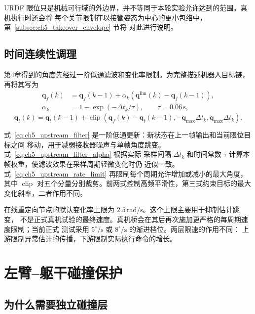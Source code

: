 URDF 限位只是机械可行域的外边界，并不等同于本轮实验允许达到的范围。真机执行时还会将
每个关节限制在以接管姿态为中心的更小包络中，第~\ref{subsec:ch5_takeover_envelope} 节将
对此进行说明。

\subsection{时间连续性调理}
\label{subsec:ch5_temporal_conditioning}

第4章得到的角度先经过一阶低通滤波和变化率限制。为完整描述机器人目标链，再将其写为
\begin{align}
  \boldsymbol q_f(k)
  &=\boldsymbol q_f(k-1)+
  \alpha_k\left(\boldsymbol q^{\mathrm{lim}}(k)-
  \boldsymbol q_f(k-1)\right),
  \label{eq:ch5_upstream_filter}\\
  \alpha_k&=1-\exp(-\Delta t_k/\tau),
  \qquad \tau=0.06\,\mathrm{s},
  \label{eq:ch5_upstream_filter_alpha}
\end{align}
\begin{equation}
  \boldsymbol q_t(k)=\boldsymbol q_t(k-1)+
  \operatorname{clip}\!\left(
  \boldsymbol q_f(k)-\boldsymbol q_t(k-1),
  -\dot{\boldsymbol q}_{\max}\Delta t_k,
  \dot{\boldsymbol q}_{\max}\Delta t_k
  \right).
  \label{eq:ch5_upstream_rate_limit}
\end{equation}

式~\eqref{eq:ch5_upstream_filter} 是一阶低通更新：新状态在上一帧输出和当前限位目标之间
移动，用于减弱接收器噪声与单帧角度跳变。式~\eqref{eq:ch5_upstream_filter_alpha} 根据实际
采样间隔 $\Delta t_k$ 和时间常数 $\tau$ 计算本帧权重，使滤波效果在采样周期轻微变化时仍
近似一致。式~\eqref{eq:ch5_upstream_rate_limit} 再限制每个周期允许增加或减小的最大角度，
其中 $\operatorname{clip}$ 对五个分量分别裁剪。前两式控制高频平滑性，第三式约束目标的最大
变化斜率，二者作用不同。

在线重定向节点的默认变化率上限为 $2.5\,\mathrm{rad/s}$。这个上限主要用于抑制估计跳变，
不是正式真机试验的最终速度。真机桥会在其后再次施加更严格的每周期速度限制；当前正式
测试采用 $5^\circ/\mathrm{s}$ 或 $8^\circ/\mathrm{s}$ 的渐进档位。两层限速的作用不同：
上游限制异常估计的传播，下游限制实际执行命令的增长。

\section{左臂--躯干碰撞保护}
\label{sec:ch5_torso_collision}

\subsection{为什么需要独立碰撞层}
\label{subsec:ch5_collision_motivation}

